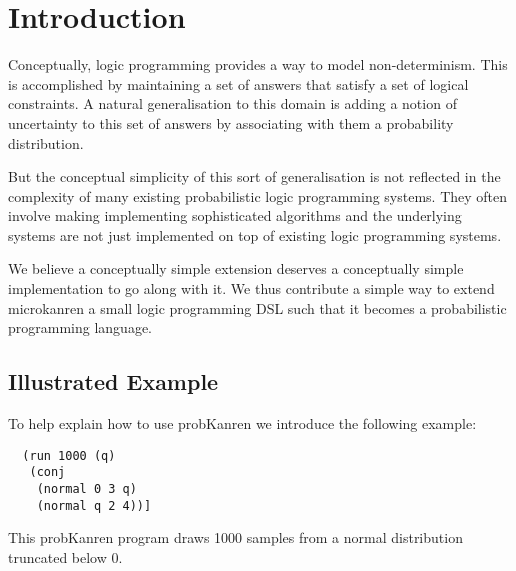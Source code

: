 \documentclass[
]{ceurart}
\begin{document}
\maketitle

\section{Introduction}

Conceptually, logic programming provides a way to model
non-determinism. This is accomplished by maintaining a set of answers
that satisfy a set of logical constraints. A natural generalisation
to this domain is adding a notion of uncertainty to this set of answers
by associating with them a probability distribution.

But the conceptual simplicity of this sort of generalisation is not reflected
in the complexity of many existing probabilistic logic programming systems.
They often involve making implementing sophisticated algorithms and the underlying
systems are not just implemented on top of existing logic programming systems.

We believe a conceptually simple extension deserves a conceptually
simple implementation to go along with it. We thus contribute a simple
way to extend microkanren a small logic programming DSL such that it
becomes a probabilistic programming language.

\subsection{Illustrated Example}

To help explain how to use probKanren we introduce the following example:


\begin{verbatim}
  (run 1000 (q)
   (conj
    (normal 0 3 q)
    (normal q 2 4))]
\end{verbatim}


This probKanren program draws 1000 samples from a normal distribution truncated
below 0.
\end{document}
